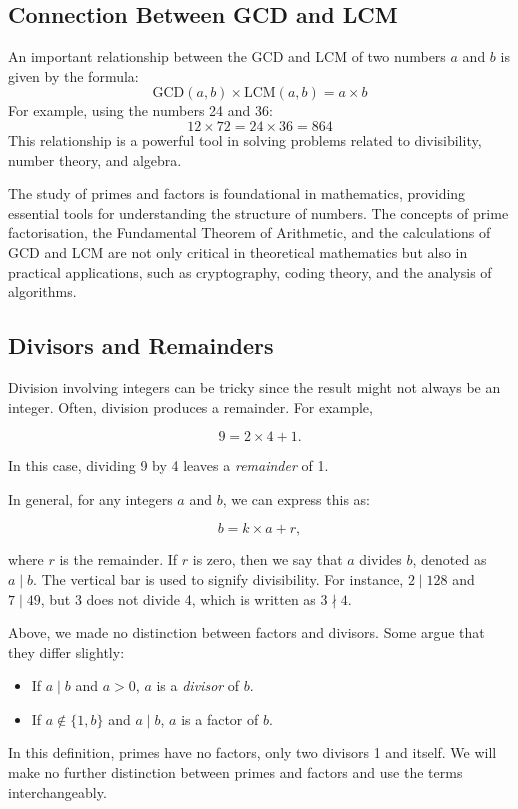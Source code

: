 \subsection*{Connection Between GCD and LCM}

An important relationship between the GCD and LCM of two numbers \(a\) and \(b\) is given by the formula:
\[
\text{GCD}(a, b) \times \text{LCM}(a, b) = a \times b
\]
For example, using the numbers 24 and 36:
\[
12 \times 72 = 24 \times 36 = 864
\]
This relationship is a powerful tool in solving problems related to divisibility, number theory, and algebra.

The study of primes and factors is foundational in mathematics, providing essential tools for understanding the structure of numbers. The concepts of prime factorisation, the Fundamental Theorem of Arithmetic, and the calculations of GCD and LCM are not only critical in theoretical mathematics but also in practical applications, such as cryptography, coding theory, and the analysis of algorithms.

\subsection*{Divisors and Remainders}
\label{sec:2.3Mod}
Division involving integers can be tricky since the result might not always be an integer. Often, division produces a remainder. For example,

\[
9 = 2 \times 4 + 1.
\]

In this case, dividing 9 by 4 leaves a \textit{remainder} of 1.

In general, for any integers \(a\) and \(b\), we can express this as:

\[
b = k \times a + r,
\]

where \(r\) is the remainder. If \(r\) is zero, then we say that \(a\) divides \(b\), denoted as \(a \mid b\). The vertical bar is used to signify divisibility. For instance, \(2 \mid 128\) and \(7 \mid 49\), but 3 does not divide 4, which is written as \(3 \nmid 4\).

Above, we made no distinction between factors and divisors. Some argue that they differ slightly:
\begin{itemize}
    \item If $a \mid b$ and $a>0$, $a$ is a \textit{divisor} of $b$.
    \item If $a \notin \{1, b\}$ and $a \mid b$, $a$ is a factor of $b$.
\end{itemize}
In this definition, primes have no factors, only two divisors 1 and itself. We will make no further distinction between primes and factors and use the terms interchangeably.

